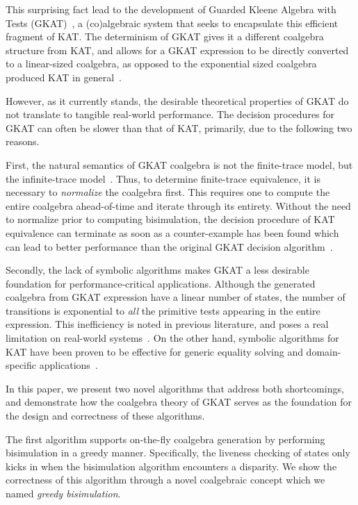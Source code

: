 \documentclass[conference]{IEEEtran}
\begin{document}
This surprising fact lead to the development of Guarded Kleene Algebra with Tests (GKAT)~\cite{smolka_GuardedKleeneAlgebra_2020}, a (co)algebraic system that seeks to encapsulate this efficient fragment of KAT.
The determinism of GKAT gives it a different coalgebra structure from KAT, and allows for a GKAT expression to be directly converted to a linear-sized coalgebra, as opposed to the exponential sized coalgebra produced KAT in general~\cite{smolka_GuardedKleeneAlgebra_2020,kozen_CoalgebraicTheoryKleene_2017}.

However, as it currently stands, the desirable theoretical properties of GKAT do not translate to tangible real-world performance. 
The decision procedures for GKAT can often be slower than that of KAT, primarily, due to the following two reasons.

First, the natural semantics of GKAT coalgebra is not the finite-trace model, but the infinite-trace model~\cite{smolka_GuardedKleeneAlgebra_2020,schmid_GuardedKleeneAlgebra_2021}.
Thus, to determine finite-trace equivalence, it is necessary to \emph{normalize} the coalgebra first. This requires one to compute the entire coalgebra ahead-of-time and iterate through its entirety.
Without the need to normalize prior to computing bisimulation, the decision procedure of KAT equivalence can terminate as soon as a counter-example has been found which can lead to better performance than the original GKAT decision algorithm~\cite{smolka_GuardedKleeneAlgebra_2020}.

Secondly, the lack of symbolic algorithms makes GKAT a less desirable foundation for performance-critical applications.
Although the generated coalgebra from GKAT expression have a linear number of states, the number of transitions is exponential to \emph{all} the primitive tests appearing in the entire expression.
This inefficiency is noted in previous literature, and poses a real limitation on real-world systems~\cite{smolka_GuardedKleeneAlgebra_2020,zhang_CFGKATEfficientValidation_2025}.
On the other hand, symbolic algorithms for KAT have been proven to be effective for generic equality solving and domain-specific applications~\cite{pous_SymbolicAlgorithmsLanguage_2015,moeller_KATchFastSymbolic_2024}.

In this paper, we present two novel algorithms that address both shortcomings, and demonstrate how the coalgebra theory of GKAT serves as the foundation for the design and correctness of these algorithms.

The first algorithm supports on-the-fly coalgebra generation by performing bisimulation in a greedy manner.
Specifically, the liveness checking of states only kicks in when the bisimulation algorithm encounters a disparity.
We show the correctness of this algorithm through a novel coalgebraic concept which we named \emph{greedy bisimulation}.
\end{document}
